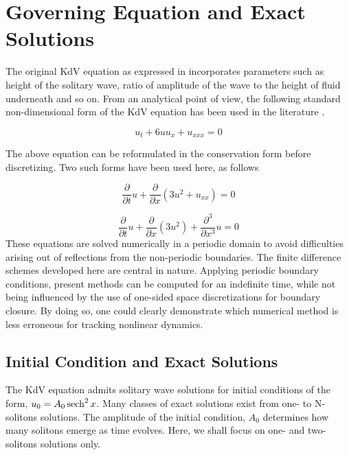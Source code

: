\section{Governing Equation and Exact Solutions}
\label{sec:goveq}
The original KdV equation as expressed in \cite{Informa} incorporates parameters such as height of the solitary wave, ratio of amplitude of the wave to the height of fluid underneath and so on. From an analytical point of view, the following standard non-dimensional form of the KdV equation has been used in the literature \cite{Taha1984}.

\begin{equation}
\label{eq:kdv}
u_t + 6 uu_x + u_{xxx} = 0
\end{equation}

The above equation can be reformulated in the conservation form before discretizing. Two such forms have been used here, as follows

\begin{equation}
\label{eq:ckdv1}
\frac{\partial}{\partial t}u + \frac{\partial}{\partial x} \left(3 u^2 + u_{xx}\right) = 0
\end{equation}

\begin{equation}
\label{eq:ckdv2}
\frac{\partial}{\partial t}u +  \frac{\partial}{\partial x}(3u^2) + \frac{\partial^3}{\partial x^3}u = 0
\end{equation}
These equations are solved numerically in a periodic domain to avoid difficulties arising out of reflections from the non-periodic boundaries. The finite difference schemes developed here are central in nature. Applying periodic boundary conditions, present methods can be computed for an indefinite time, while not being influenced by the use of one-sided space discretizations for boundary closure. By doing so, one could clearly demonstrate which numerical method is less erroneous for tracking nonlinear dynamics.

\subsection{Initial Condition and Exact Solutions}
\label{subsec:init}
The KdV equation admits solitary wave solutions for initial conditions of the form, $u_0 = A_0 \operatorname{sech}^2x$. Many classes of exact solutions exist from 
one- to N-solitons solutions. The amplitude of the initial condition, $A_0$ determines how many solitons emerge as time evolves. Here, we shall focus 
on one- and two-solitons solutions only.

